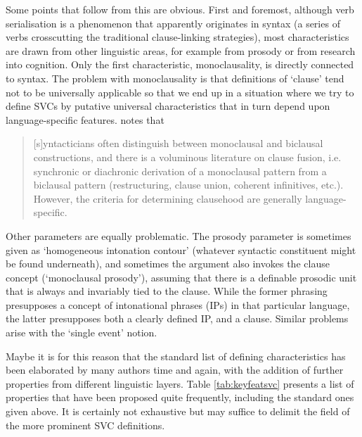Some points that follow from this are obvious. First and foremost, although verb serialisation is a phenomenon that apparently originates in syntax (a series of verbs crosscutting the traditional clause-linking strategies), most characteristics are drawn from other linguistic areas, for example from prosody or from research into cognition. Only the first characteristic, monoclausality, is directly connected to syntax. The problem with monoclausality is that definitions of `clause' tend not to be universally applicable so that we end up in a situation where we try to define SVCs by putative universal characteristics that in turn depend upon language-specific features. \citet[298]{haspelmath2016serial} notes that \begin{quote}[s]yntacticians often distinguish between monoclausal and biclausal constructions, and there is a voluminous literature on clause fusion, i.e. synchronic or diachronic derivation of a monoclausal pattern from a biclausal pattern
(restructuring, clause union, coherent infinitives, etc.). However, the criteria for determining clausehood are generally language-specific.\end{quote}

Other parameters are equally problematic. The prosody parameter is sometimes given as `homogeneous intonation contour' (whatever syntactic constituent might be found underneath), and sometimes the argument also invokes the clause concept (`monoclausal prosody'), assuming that there is a definable prosodic unit that is always and invariably tied to the clause. While the former phrasing presupposes a concept of intonational phrases (IPs) in that particular language, the latter presupposes both a clearly defined IP, and a clause. Similar problems arise with the `single event' notion.

Maybe it is for this reason that the standard list of defining characteristics has been elaborated by many authors time and again, with the addition of further properties from different linguistic layers. Table \ref{tab:keyfeatsvc} presents a list of properties that have been proposed quite frequently, including the standard ones given above. It is certainly not exhaustive but may suffice to delimit the field of the more prominent SVC definitions.

